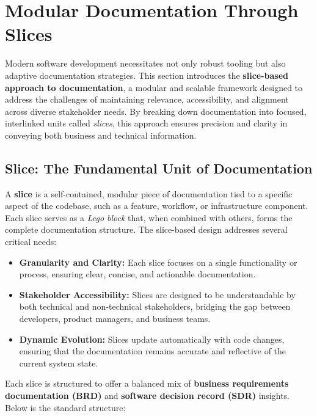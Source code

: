 \documentclass[12pt,oneside]{article}
\begin{document}
\section{Modular Documentation Through Slices}

Modern software development necessitates not only robust tooling but also adaptive documentation strategies. This section introduces the \textbf{slice-based approach to documentation}, a modular and scalable framework designed to address the challenges of maintaining relevance, accessibility, and alignment across diverse stakeholder needs. By breaking down documentation into focused, interlinked units called \textit{slices}, this approach ensures precision and clarity in conveying both business and technical information.

\subsection{Slice: The Fundamental Unit of Documentation}

A \textbf{slice} is a self-contained, modular piece of documentation tied to a specific aspect of the codebase, such as a feature, workflow, or infrastructure component. Each slice serves as a \textit{Lego block} that, when combined with others, forms the complete documentation structure. The slice-based design addresses several critical needs:
\begin{itemize}
    \item \textbf{Granularity and Clarity:} Each slice focuses on a single functionality or process, ensuring clear, concise, and actionable documentation.
    \item \textbf{Stakeholder Accessibility:} Slices are designed to be understandable by both technical and non-technical stakeholders, bridging the gap between developers, product managers, and business teams.
    \item \textbf{Dynamic Evolution:} Slices update automatically with code changes, ensuring that the documentation remains accurate and reflective of the current system state.
\end{itemize}

Each slice is structured to offer a balanced mix of \textbf{business requirements documentation (BRD)} 
and \textbf{software decision record (SDR)} insights. Below is the standard structure:
\end{document}
